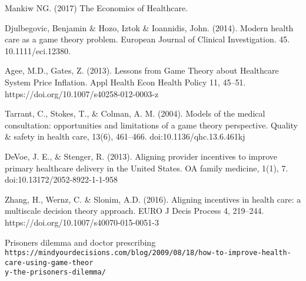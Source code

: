 \documentclass{article}
\begin{document}
\begin{thebibliography}{9}

Mankiw NG. (2017) The Economics of Healthcare.

Djulbegovic, Benjamin \& Hozo, Iztok \& Ioannidis, John. (2014). Modern health care as a game theory problem. European Journal of Clinical Investigation. 45. 10.1111/eci.12380.

Agee, M.D., Gates, Z. (2013). Lessons from Game Theory about Healthcare System Price Inflation. Appl Health Econ Health Policy 11, 45–51. https://doi.org/10.1007/s40258-012-0003-z

Tarrant, C., Stokes, T., \& Colman, A. M. (2004). Models of the medical consultation: opportunities and limitations of a game theory perspective. Quality \& safety in health care, 13(6), 461–466. doi:10.1136/qhc.13.6.461kj

DeVoe, J. E., \& Stenger, R. (2013). Aligning provider incentives to improve primary healthcare delivery in the United States. OA family medicine, 1(1), 7. doi:10.13172/2052-8922-1-1-958

Zhang, H., Wernz, C. \& Slonim, A.D. (2016). Aligning incentives in health care: a multiscale decision theory approach. EURO J Decis Process 4, 219–244. https://doi.org/10.1007/s40070-015-0051-3

Prisoners dilemma and doctor prescribing
\\\texttt{https://mindyourdecisions.com/blog/2009/08/18/how-to-improve-health-care-using-game-theor\\y-the-prisoners-dilemma/}
\end{thebibliography}

\end{document}
